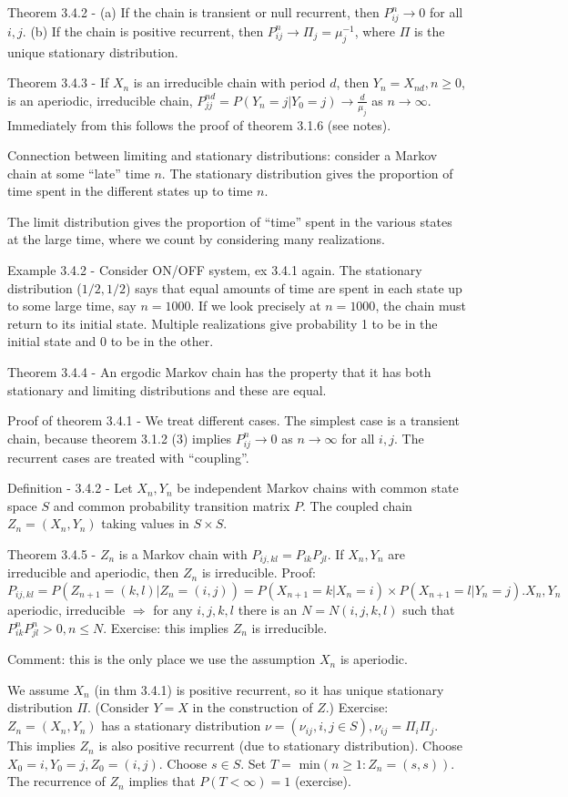 \documentclass{article}
\begin{document}
Theorem 3.4.2 - (a) If the chain is transient or null recurrent, then $P_{ij}^n \rightarrow 0$ for all $i, j$. (b) If the chain is positive recurrent, then $P_{ij}^n \rightarrow \Pi_j = \mu_j^{-1}$, where $\Pi$ is the unique stationary distribution.

Theorem 3.4.3 - If $X_n$ is an irreducible chain with period $d$, then $Y_n = X_{nd}, n \ge 0$, is an aperiodic, irreducible chain, $P_{jj}^{nd} = P(Y_n=j | Y_0=j) \rightarrow \frac{d}{\mu_j}$ as $n \rightarrow \infty$. Immediately from this follows the proof of theorem 3.1.6 (see notes).

Connection between limiting and stationary distributions: consider a Markov chain at some ``late'' time $n$. The stationary distribution gives the proportion of time spent in the different states up to time $n$.

The limit distribution gives the proportion of ``time'' spent in the various states at the large time, where we count by considering many realizations.

Example 3.4.2 - Consider ON/OFF system, ex 3.4.1 again. The stationary distribution ($1/2, 1/2$) says that equal amounts of time are spent in each state up to some large time, say $n = 1000$. If we look precisely at $n = 1000$, the chain must return to its initial state. Multiple realizations give probability 1 to be in the initial state and 0 to be in the other.

Theorem 3.4.4 - An ergodic Markov chain has the property that it has both stationary and limiting distributions and these are equal.

Proof of theorem 3.4.1 - We treat different cases. The simplest case is a transient chain, because theorem 3.1.2 (3) implies $P_{ij}^n \rightarrow 0$ as $n \rightarrow \infty$ for all $i, j$. The recurrent cases are treated with ``coupling''.

Definition - 3.4.2 - Let $X_n, Y_n$ be independent Markov chains with common state space $S$ and common probability transition matrix $P$. The coupled chain $Z_n = (X_n, Y_n)$ taking values in $S \times S$.

Theorem 3.4.5 - $Z_n$ is a Markov chain with $P_{ij, kl} = P_{ik}P_{jl}$. If $X_n, Y_n$ are irreducible and aperiodic, then $Z_n$ is irreducible. Proof: $P_{ij, kl} = P(Z_{n+1} = (k, l) | Z_n = (i, j)) = P(X_{n+1} = k | X_n=i) \times P(X_{n+1} = l | Y_n = j). X_n, Y_n$ aperiodic, irreducible $\Rightarrow$ for any $i, j, k, l$ there is an $N = N(i, j, k, l)$ such that $P_{ik}^n P_{jl}^n > 0, n \le N$. Exercise: this implies $Z_n$ is irreducible.

Comment: this is the only place we use the assumption $X_n$ is aperiodic.

We assume $X_n$ (in thm 3.4.1) is positive recurrent, so it has unique stationary distribution $\Pi$. (Consider $Y = X$ in the construction of $Z$.) Exercise: $Z_n = (X_n, Y_n)$ has a stationary distribution $\nu = (\nu_{ij}, i, j \in S), \nu_{ij} = \Pi_i \Pi_j$. This implies $Z_n$ is also positive recurrent (due to stationary distribution). Choose $X_0 = i, Y_0 = j, Z_0 = (i, j)$. Choose $s \in S$. Set $T =$ min$(n \ge 1: Z_n = (s, s))$. The recurrence of $Z_n$ implies that $P(T < \infty) = 1$ (exercise).
\end{document}
